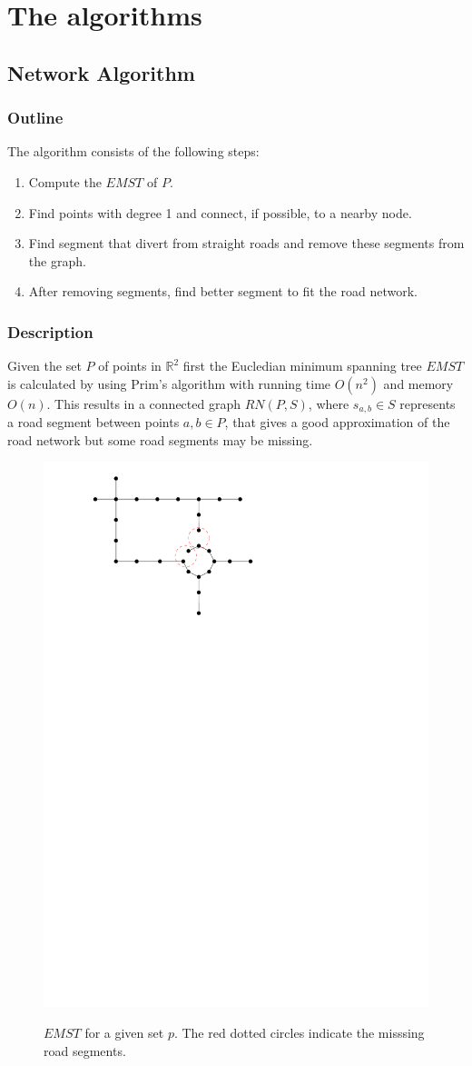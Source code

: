 \documentclass[11pt]{article}
\begin{document}
\section{The algorithms}
\label{se:algorithms}
\subsection{Network Algorithm}
\subsubsection{Outline}
The algorithm consists of the following steps:
\begin{enumerate}
  \item Compute the $EMST$ of $P$.
  \item Find points with degree 1 and connect, if possible, to a nearby node.
  \item Find segment that divert from straight roads and remove these segments from the graph.
  \item After removing segments, find better segment to fit the road network.
\end{enumerate}
  
\subsubsection{Description}
Given the set $P$ of points in $\mathbb{R}^2$ first the Eucledian minimum spanning tree $EMST$ is calculated by using Prim's algorithm with running time $O(n^2)$ and memory $O(n)$. This results in a connected graph $RN(P,S)$, where $s_{a,b}\in S$ represents a road segment between points $a,b \in P$, that gives a good approximation of the road network but some road segments may be missing.

\begin{figure}[h]
  \centering
      \graphicspath{ {images/}}
      \includegraphics[width=0.5\linewidth]{NetworkMST}
      \label{fig:EMST}
      \caption{$EMST$ for a given set $p$. The red dotted circles indicate the misssing road segments.}
  \end{figure}
\end{document}

